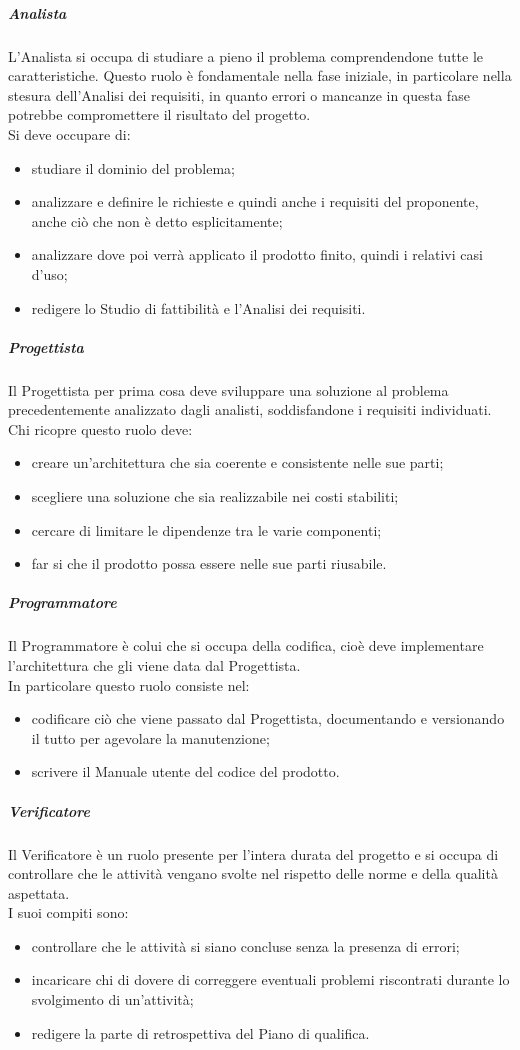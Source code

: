 \subparagraph{Analista}
L'Analista si occupa di studiare a pieno il problema comprendendone tutte le caratteristiche. Questo ruolo è fondamentale nella fase iniziale, in particolare nella stesura dell'Analisi dei requisiti, in quanto errori o mancanze in questa fase potrebbe compromettere il risultato del progetto.\\
Si deve occupare di:
\begin{itemize}
    \item studiare il dominio del problema;
    \item analizzare e definire le richieste e quindi anche i requisiti del proponente, anche ciò che non è detto esplicitamente;
    \item analizzare dove poi verrà applicato il prodotto finito, quindi i relativi casi d'uso;
    \item redigere lo Studio di fattibilità e l'Analisi dei requisiti.
\end{itemize}

\subparagraph{Progettista}
Il Progettista per prima cosa deve sviluppare una soluzione al problema precedentemente analizzato dagli analisti, soddisfandone i requisiti individuati.\\
Chi ricopre questo ruolo deve:
\begin{itemize}
    \item creare un'architettura che sia coerente e consistente nelle sue parti;
    \item scegliere una soluzione che sia realizzabile nei costi stabiliti;
    \item cercare di limitare le dipendenze tra le varie componenti;
    \item far si che il prodotto possa essere nelle sue parti riusabile.
\end{itemize}

\subparagraph{Programmatore}
Il Programmatore è colui che si occupa della codifica, cioè deve implementare l'architettura che gli viene data dal Progettista.\\
In particolare questo ruolo consiste nel:
\begin{itemize}
    \item codificare ciò che viene passato dal Progettista, documentando e versionando il tutto per agevolare la manutenzione;
    \item scrivere il Manuale utente del codice del prodotto.
\end{itemize}

\subparagraph{Verificatore}
Il Verificatore è un ruolo presente per l'intera durata del progetto e si occupa di controllare che le attività vengano svolte nel rispetto delle norme e della qualità aspettata.\\
I suoi compiti sono:
\begin{itemize}
    \item controllare che le attività si siano concluse senza la presenza di errori;
    \item incaricare chi di dovere di correggere eventuali problemi riscontrati durante lo svolgimento di un'attività;
    \item redigere la parte di retrospettiva del Piano di qualifica.
\end{itemize}

